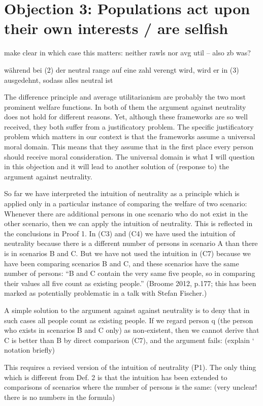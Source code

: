 \section{Objection 3: Populations act upon their own interests / are selfish}

make clear in which case this matters: neither rawls nor avg util – also zb was? 

während bei (2) der neutral range auf eine zahl verengt wird, wird er in (3) ausgedehnt, sodass alles neutral ist 

The difference principle and average utilitarianism are probably the two most prominent welfare functions. In both of them the argument against neutrality does not hold for different reasons. Yet, although these frameworks are so well received, they both suffer from a justificatory problem. The specific justificatory problem which matters in our context is that the frameworks assume a universal moral domain. This means that they assume that in the first place every person should receive moral consideration. The universal domain is what I will question in this objection and it will lead to another solution of (response to) the argument against neutrality.  

So far we have interpreted the intuition of neutrality as a principle which is applied only in a particular instance of comparing the welfare of two scenario: Whenever there are additional persons in one scenario who do not exist in the other scenario, then we can apply the intuition of neutrality. This is reflected in the conclusions in Proof 1. In (C3) and (C4) we have used the intuition of neutrality because there is a different number of persons in scenario A than there is in scenarios B and C. But we have not used the intuition in (C7) because we have been comparing scenarios B and C, and these scenarios have the same number of persons: “B and C contain the very same five people, so in comparing their values all five count as existing people.” (\label{ref:RNDdoGn25412e}Broome 2012, p.177; this has been marked as potentially problematic in a talk with Stefan Fischer.) 

A simple solution to the argument against against neutrality is to deny that in such cases all people count as existing people. If we regard person q (the person who exists in scenarios B and C only) as non-existent, then we cannot derive that C is better than B by direct comparison (C7), and the argument fails: (explain ‘ notation briefly) 
\begin{comment}
\ \ (C7’)\ \ (A1) ${\wedge}$ (A2) ${\wedge}$ (A3) \ $\Rightarrow $ \ uB(P0) {\textgreater} uC(P0) 

\ \ (C8’)\ \ (C7’) ${\wedge}$ (P1) \ $\Rightarrow $ \ uB(P0 ${\cup}$ P+) {\textgreater} uC(P0 ${\cup}$ P+) 

\ \ (C9’)\ \ (C4) \ $\Leftrightarrow $ \ (C8) 
\end{comment}
This requires a revised version of the intuition of neutrality (P1). The only thing which is different from Def. 2 is that the intuition has been extended to comparisons of scenarios where the number of persons is the same: (very unclear! there is no numbers in the formula) 

